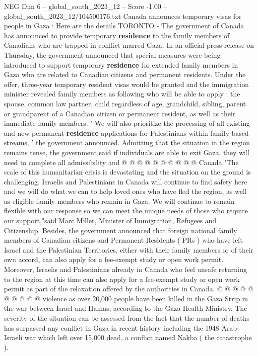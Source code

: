 \begin{textsample}{NEG Dim 6 – global\_south\_2023\_12 – Score -1.00 – global\_south\_2023\_12/104500176.txt}  \label{ex:f6_neg_351}
Canada announces temporary visas for people in Gaza : Here are the details TORONTO - The government of Canada has announced to provide temporary \textbf{residence} to the family members of Canadians who are trapped in conflict-marred Gaza.
In an official press release on Thursday, the government announced that special measures were being introduced to support temporary \textbf{residence} for extended family members in Gaza who are related to Canadian citizens and permanent residents.
Under the offer, three-year temporary resident visas would be granted and the immigration minister revealed family members as following who will be able to apply : the spouse, common law partner, child regardless of age, grandchild, sibling, parent or grandparent of a Canadian citizen or permanent resident, as well as their immediate family members. ' We will also prioritize the processing of all existing and new permanent \textbf{residence} applications for Palestinians within family-based streams, ' the government announced.
Admitting that the situation in the region remains tense, the government said if individuals are able to exit Gaza, they will need to complete all admissibility and @ @ @ @ @ @ @ @ @ @ Canada."The scale of this humanitarian crisis is devastating and the situation on the ground is challenging.
Israelis and Palestinians in Canada will continue to find safety here and we will do what we can to help loved ones who have fled the region, as well as eligible family members who remain in Gaza.
We will continue to remain flexible with our response so we can meet the unique needs of those who require our support,"said Marc Miller, Minister of Immigration, Refugees and Citizenship.
Besides, the government announced that foreign national family members of Canadian citizens and Permanent Residents ( PRs ) who have left Israel and the Palestinian Territories, either with their family members or of their own accord, can also apply for a fee-exempt study or open work permit.
Moreover, Israelis and Palestinians already in Canada who feel unsafe returning to the region at this time can also apply for a fee-exempt study or open work permit as part of the relaxation offered by the authorities in Canada. @ @ @ @ @ @ @ @ @ @ violence as over 20,000 people have been killed in the Gaza Strip in the war between Israel and Hamas, according to the Gaza Health Ministry.
The severity of the situation can be assessed from the fact that the number of deaths has surpassed any conflict in Gaza in recent history including the 1948 Arab-Israeli war which left over 15,000 dead, a conflict named Nakba ( the catastrophe ).

\end{textsample}
